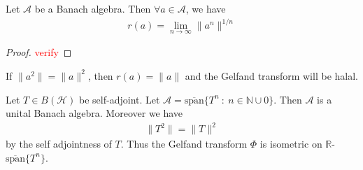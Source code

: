 \begin{theorem}
  \label{thm:beurling}
  Let $\mathcal{A}$ be a Banach algebra. Then $\forall a \in
  \mathcal{A}$, we have
  \begin{align*}
    r(a) = \lim_{n \to \infty} \|a^n\|^{1/n}
  \end{align*}
\end{theorem}
\begin{proof}
  \textcolor{red}{verify}
\end{proof}

\begin{corollary}
  If $\|a^2\| = \|a\|^2$, then $r(a) = \|a\|$ and the Gelfand
  transform will be halal.
  \marginnote{ \scriptsize \it \textcolor{red}{not sure. Might need
  C* algebra structure}}
\end{corollary}

\begin{example}
  Let $T \in B(\mathcal{H})$ be self-adjoint. Let $\mathcal{A} =
  \overline{\textrm{span}}\{ T^n  \ : \  n \in \mathbb{N} \cup {0}
  \}$. Then $\mathcal{A}$ is a unital Banach algebra. Moreover we have
  \begin{align*}
    \|T^2\| = \|T\|^{2}
  \end{align*}
  by the self adjointness of $T$. Thus the Gelfand transform $\Phi$
  is isometric on $\mathbb{R}$-$\overline{\textrm{span}}\{T^n\}$.
\end{example}
